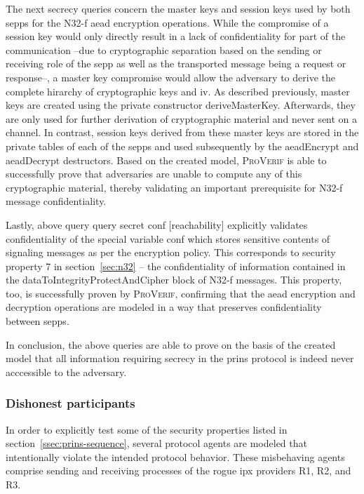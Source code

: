 The next secrecy queries concern the master keys and session keys used by both \glspl{sepp} for the N32-f \gls{aead} encryption operations.
While the compromise of a session key would only directly result in a lack of confidentiality for part of the communication --due to cryptographic separation based on the sending or receiving role of the \gls{sepp} as well as the transported message being a request or response--, a master key compromise would allow the adversary to derive the complete hirarchy of cryptographic keys and \gls{iv}.
As described previously, master keys are created using the private constructor {\sffamily deriveMasterKey}.
Afterwards, they are only used for further derivation of cryptographic material and never sent on a channel.
In contrast, session keys derived from these master keys are stored in the private tables of each of the \glspl{sepp} and used subsequently by the {\sffamily aeadEncrypt} and {\sffamily aeadDecrypt} destructors.
Based on the created model, \textsc{ProVerif} is able to successfully prove that adversaries are unable to compute any of this cryptographic material, thereby validating an important prerequisite for N32-f message confidentiality.

Lastly, above query {\sffamily query secret conf [reachability]} explicitly validates confidentiality of the special variable {\sffamily conf} which stores sensitive contents of signaling messages as per the encryption policy.
This corresponds to security property 7 in section~\ref{sec:n32} -- the confidentiality of information contained in the {\sffamily dataToIntegrityProtectAndCipher} block of N32-f messages.
This property, too, is successfully proven by \textsc{ProVerif}, confirming that the \gls{aead} encryption and decryption operations are modeled in a way that preserves confidentiality between \glspl{sepp}.

In conclusion, the above queries are able to prove on the basis of the created model that all information requiring secrecy in the \gls{prins} protocol is indeed never acccessible to the adversary.

\subsubsection{Dishonest participants}

In order to explicitly test some of the security properties listed in section~\ref{ssec:prins-sequence}, several protocol agents are modeled that intentionally violate the intended protocol behavior.
These misbehaving agents comprise sending and receiving processes of the rogue \gls{ipx} providers R1, R2, and R3.

